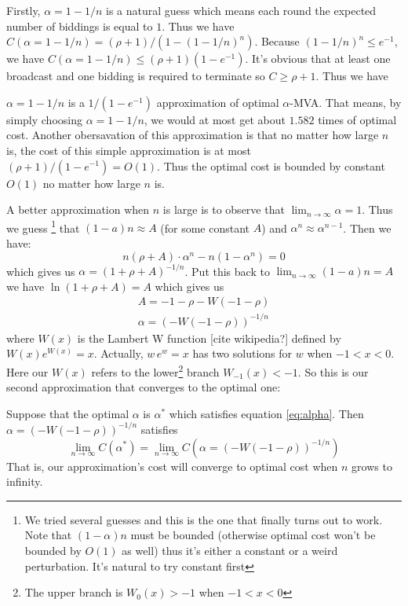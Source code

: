 Firstly, $\alpha = 1-1/n$ is a natural guess which means each round the
expected number of biddings is equal to $1$. Thus we have $C(\alpha = 1-1/n) =
(\rho+1)/(1-(1-1/n)^n)$. Because $(1-1/n)^n \leq e^{-1}$, we have $C(\alpha =
1-1/n) \leq (\rho+1)(1-e^{-1})$.  It's obvious that at least one broadcast and
one bidding is required to terminate so $C \geq \rho+1$.  Thus we have

\begin{theorem}
$\alpha = 1-1/n$ is a $1/(1-e^{-1})$ approximation of optimal $\alpha$-MVA.
That means, by simply choosing $\alpha = 1-1/n$, we would at most get about
$1.582$ times of optimal cost. Another obersavation of this approximation is
that no matter how large $n$ is, the cost of this simple approximation is at
most $(\rho+1) / (1-e^{-1}) = O(1)$. Thus the optimal cost is bounded by
constant $O(1)$ no matter how large $n$ is.
\end{theorem}

A better approximation when $n$ is large is to observe that $\lim_{n
\rightarrow \infty} \alpha = 1$.  Thus we guess \footnote{We tried several
guesses and this is the one that finally turns out to work. Note that
$(1-\alpha)n$ must be bounded (otherwise optimal cost won't be bounded by
$O(1)$ as well) thus it's either a constant or a weird perturbation. It's
natural to try constant first} that $(1-a)n
\approx A$ (for some constant $A$) and $\alpha^n \approx \alpha^{n-1}$. Then we
have: $$ n (\rho+A) \cdot \alpha^n - n(1-\alpha^n) = 0 $$ which gives us
$\alpha = (1+\rho+A)^{-1/n}$. Put this back to $\lim_{n \rightarrow \infty}
(1-a)n = A$ we have $\ln (1+\rho+A) = A$ which gives us
\begin{align}\label{eq:approx2}
A = -1-\rho-W(-1-\rho)\nonumber\\
\alpha = (-W(-1-\rho))^{-1/n} 
\end{align}
where $W(x)$ is the Lambert W function [cite wikipedia?] defined by $W(x)
e^{W(x)} = x$. Actually, $w\,e^w = x$ has two solutions for $w$ when $-1 < x <
0$. Here our $W(x)$ refers to the lower\footnote{The upper branch is
$W_0(x) > -1$ when $-1 < x < 0$} branch $W_{-1}(x) < -1$. So this is
our second approximation that converges to the optimal one:

\begin{theorem}\label{theorem:approx1}
Suppose that the optimal $\alpha$ is $\alpha^*$ which
satisfies equation \ref{eq:alpha}. Then $\alpha = (-W(-1-\rho))^{-1/n}$ satisfies
$$\lim_{n \rightarrow \infty} C(\alpha^*) = \lim_{n \rightarrow \infty} C(\alpha = (-W(-1-\rho))^{-1/n})$$
That is, our approximation's cost will converge to optimal cost when $n$ grows to
infinity.
\end{theorem}

